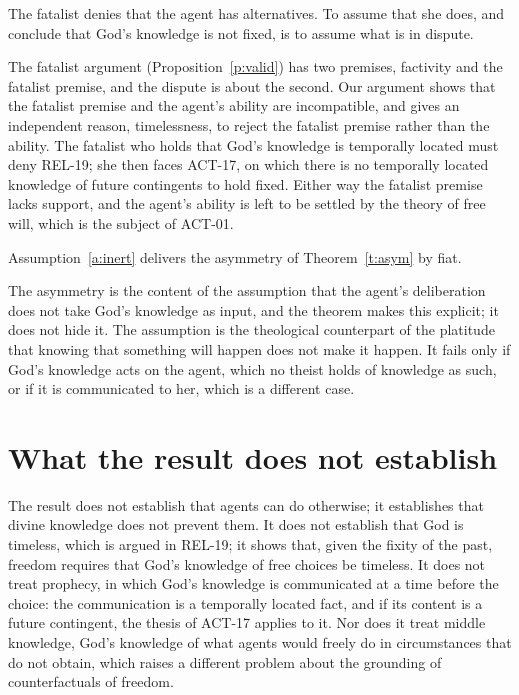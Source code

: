 \documentclass{situationist-preprint}
\begin{document}
\begin{objection}
The fatalist denies that the agent has alternatives. To assume that she does, and conclude that God's knowledge is not fixed, is to assume what is in dispute.
\end{objection}

\begin{reply}
The fatalist argument (Proposition~\ref{p:valid}) has two premises, factivity and the fatalist premise, and the dispute is about the second. Our argument shows that the fatalist premise and the agent's ability are incompatible, and gives an independent reason, timelessness, to reject the fatalist premise rather than the ability. The fatalist who holds that God's knowledge is temporally located must deny REL-19; she then faces ACT-17, on which there is no temporally located knowledge of future contingents to hold fixed. Either way the fatalist premise lacks support, and the agent's ability is left to be settled by the theory of free will, which is the subject of ACT-01.
\end{reply}

\begin{objection}
Assumption~\ref{a:inert} delivers the asymmetry of Theorem~\ref{t:asym} by fiat.
\end{objection}

\begin{reply}
The asymmetry is the content of the assumption that the agent's deliberation does not take God's knowledge as input, and the theorem makes this explicit; it does not hide it. The assumption is the theological counterpart of the platitude that knowing that something will happen does not make it happen. It fails only if God's knowledge acts on the agent, which no theist holds of knowledge as such, or if it is communicated to her, which is a different case.
\end{reply}

\section{What the result does not establish}

The result does not establish that agents can do otherwise; it establishes that divine knowledge does not prevent them. It does not establish that God is timeless, which is argued in REL-19; it shows that, given the fixity of the past, freedom requires that God's knowledge of free choices be timeless. It does not treat prophecy, in which God's knowledge is communicated at a time before the choice: the communication is a temporally located fact, and if its content is a future contingent, the thesis of ACT-17 applies to it. Nor does it treat middle knowledge, God's knowledge of what agents would freely do in circumstances that do not obtain, which raises a different problem about the grounding of counterfactuals of freedom.
\end{document}
